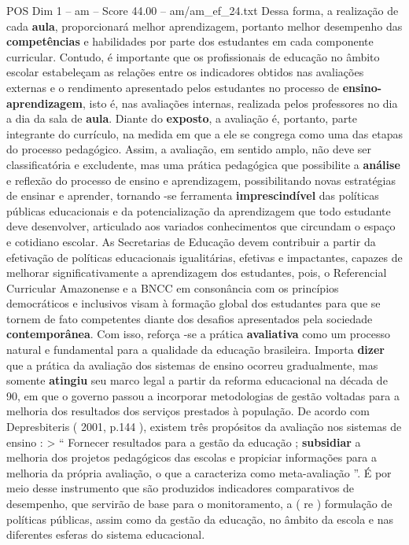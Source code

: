 \begin{textsample}{POS Dim 1 – am – Score 44.00 – am/am\_ef\_24.txt}
Dessa forma, a realização de cada \textbf{aula}, proporcionará melhor aprendizagem, portanto melhor desempenho das \textbf{competências} e habilidades por parte dos estudantes em cada componente curricular.
Contudo, é importante que os profissionais de educação no âmbito escolar estabeleçam as relações entre os indicadores obtidos nas avaliações externas e o rendimento apresentado pelos estudantes no processo de \textbf{ensino-aprendizagem}, isto é, nas avaliações internas, realizada pelos professores no dia a dia da sala de \textbf{aula}.
Diante do \textbf{exposto}, a avaliação é, portanto, parte integrante do currículo, na medida em que a ele se congrega como uma das etapas do processo pedagógico.
Assim, a avaliação, em sentido amplo, não deve ser classificatória e excludente, mas uma prática pedagógica que possibilite a \textbf{análise} e reflexão do processo de ensino e aprendizagem, possibilitando novas estratégias de ensinar e aprender, tornando -se ferramenta \textbf{imprescindível} das políticas públicas educacionais e da potencialização da aprendizagem que todo estudante deve desenvolver, articulado aos variados conhecimentos que circundam o espaço e cotidiano escolar.
As Secretarias de Educação devem contribuir a partir da efetivação de políticas educacionais igualitárias, efetivas e impactantes, capazes de melhorar significativamente a aprendizagem dos estudantes, pois, o Referencial Curricular Amazonense e a BNCC em consonância com os princípios democráticos e inclusivos visam à formação global dos estudantes para que se tornem de fato competentes diante dos desafios apresentados pela sociedade \textbf{contemporânea}.
Com isso, reforça -se a prática \textbf{avaliativa} como um processo natural e fundamental para a qualidade da educação brasileira.
Importa \textbf{dizer} que a prática da avaliação dos sistemas de ensino ocorreu gradualmente, mas somente \textbf{atingiu} seu marco legal a partir da reforma educacional na década de 90, em que o governo passou a incorporar metodologias de gestão voltadas para a melhoria dos resultados dos serviços prestados à população.
De acordo com Depresbiteris ( 2001, p.144 ), existem três propósitos da avaliação nos sistemas de ensino : > “ Fornecer resultados para a gestão da educação ; \textbf{subsidiar} a melhoria dos projetos pedagógicos das escolas e propiciar informações para a melhoria da própria avaliação, o que a caracteriza como meta-avaliação ”.
É por meio desse instrumento que são produzidos indicadores comparativos de desempenho, que servirão de base para o monitoramento, a ( re ) formulação de políticas públicas, assim como da gestão da educação, no âmbito da escola e nas diferentes esferas do sistema educacional.

\end{textsample}
